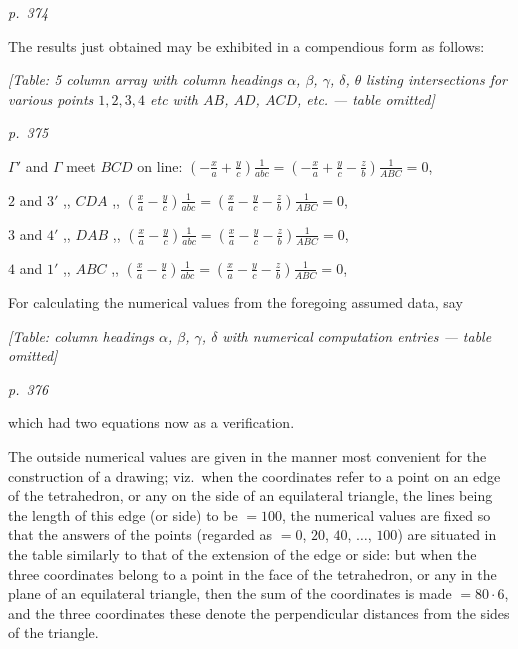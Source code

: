 \documentclass[11pt,a4paper]{book}
\begin{document}
\clearpage

\bigskip
\textit{p.~374}
\smallskip

The results just obtained may be exhibited in a compendious form as follows:
\begin{center}
\textit{[Table: 5 column array with column headings $\alpha$, $\beta$, $\gamma$, $\delta$, $\theta$}
\textit{listing intersections for various points $1, 2, 3, 4$ etc with $AB$, $AD$, $ACD$, etc.}
\textit{--- table omitted]}
\end{center}

\clearpage

\bigskip
\textit{p.~375}
\smallskip

\noindent
$\Gamma'$ and $\Gamma$ meet $BCD$ on line: $\left(-\frac{x}{a} + \frac{y}{c}\right)\frac{1}{abc} = \left(-\frac{x}{a} + \frac{y}{c} - \frac{z}{b}\right)\frac{1}{ABC} = 0$,

$2$ and $3'$ ,, $CDA$ ,, $\left(\frac{x}{a} - \frac{y}{c}\right)\frac{1}{abc} = \left(\frac{x}{a} - \frac{y}{c} - \frac{z}{b}\right)\frac{1}{ABC} = 0$,

$3$ and $4'$ ,, $DAB$ ,, $\left(\frac{x}{a} - \frac{y}{c}\right)\frac{1}{abc} = \left(\frac{x}{a} - \frac{y}{c} - \frac{z}{b}\right)\frac{1}{ABC} = 0$,

$4$ and $1'$ ,, $ABC$ ,, $\left(\frac{x}{a} - \frac{y}{c}\right)\frac{1}{abc} = \left(\frac{x}{a} - \frac{y}{c} - \frac{z}{b}\right)\frac{1}{ABC} = 0$,

For calculating the numerical values from the foregoing assumed data, say
\begin{center}
\textit{[Table: column headings $\alpha$, $\beta$, $\gamma$, $\delta$ with numerical}
\textit{computation entries --- table omitted]}
\end{center}

\clearpage

\bigskip
\textit{p.~376}
\smallskip

\noindent
which had two equations now as a verification.

The outside numerical values are given in the manner most convenient for the
construction of a drawing; viz.\ when the coordinates refer to a point on an edge of
the tetrahedron, or any on the side of an equilateral triangle, the lines being the length of
this edge (or side) to be $= 100$, the numerical values are fixed so that the answers of
the points (regarded as $= 0$, $20$, $40$, $\ldots$, $100$) are situated in the table similarly to that of
the extension of the edge or side: but when the three coordinates belong to a point
in the face of the tetrahedron, or any in the plane of an equilateral triangle, then the sum of the coordinates is made $= 80\cdot 6$, and the three coordinates these denote the
perpendicular distances from the sides of the triangle.
\end{document}
